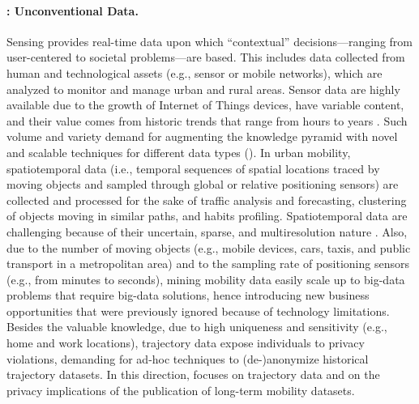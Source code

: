 \paragraph{: Unconventional Data.}
Sensing provides real-time data upon which ``contextual'' decisions---ranging from user-centered to societal problems---are based. This includes data collected from human and technological assets (e.g., sensor or mobile networks), which are analyzed to monitor and manage urban and rural areas. Sensor data are highly available due to the growth of Internet of Things devices, have variable content, and their value comes from historic trends that range from hours to years \cite{kelleher2018data}. Such volume and variety demand for augmenting the knowledge pyramid with novel and scalable techniques for different data types (). In urban mobility, spatiotemporal data (i.e., temporal sequences of spatial locations traced by moving objects and sampled through global or relative positioning sensors) are collected and processed for the sake of traffic analysis and forecasting, clustering of objects moving in similar paths, and habits profiling. Spatiotemporal data are challenging because of their uncertain, sparse, and multiresolution nature \cite{DBLP:journals/cacm/GilPBBBBCEGHHHK19}. Also, due to the number of moving objects (e.g., mobile devices, cars, taxis, and public transport in a metropolitan area) and to the sampling rate of positioning sensors (e.g., from minutes to seconds), mining mobility data easily scale up to big-data problems that require big-data solutions, hence introducing %
new business opportunities
that were previously ignored because of technology limitations. Besides the valuable knowledge, due to high uniqueness \cite{DeMontjoye2013} and sensitivity (e.g., home and work locations), trajectory data expose individuals to privacy violations, demanding for ad-hoc techniques to (de-)anonymize historical trajectory datasets. In this direction,  focuses on trajectory data and on the privacy implications of the publication of long-term mobility datasets.

